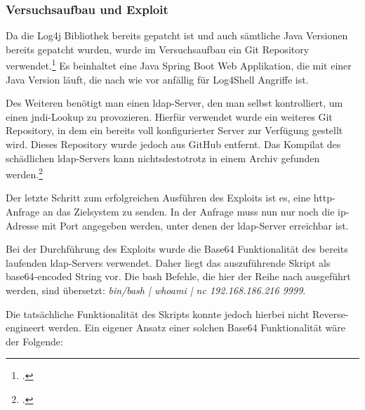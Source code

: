 
\subsubsection{Versuchsaufbau und Exploit}
Da die Log4j Bibliothek bereits gepatcht ist und auch sämtliche Java Versionen bereits gepatcht wurden, wurde im Versuchsaufbau ein Git Repository verwendet.\footcite{log4jvulnerableapp}
Es beinhaltet eine Java Spring Boot Web Applikation, die mit einer Java Version läuft, die nach wie vor anfällig für Log4Shell Angriffe ist.

Des Weiteren benötigt man einen \gls{ldap}-Server, den man selbst kontrolliert, um einen \gls{jndi}-Lookup zu provozieren.
Hierfür verwendet wurde ein weiteres Git Repository, in dem ein bereits voll konfigurierter Server zur Verfügung gestellt wird.
Dieses Repository wurde jedoch aus GitHub entfernt.
Das Kompilat des schädlichen \gls{ldap}-Servers kann nichtsdestotrotz in einem Archiv gefunden werden.\footcite{maliciousLdap}

Der letzte Schritt zum erfolgreichen Ausführen des Exploits ist es, eine \gls{http}-Anfrage an das Zielsystem zu senden.
In der Anfrage muss nun nur noch die \gls{ip}-Adresse mit Port angegeben werden, unter denen der \gls{ldap}-Server erreichbar ist.

\bigskip

Bei der Durchführung des Exploits wurde die Base64 Funktionalität des bereits laufenden \gls{ldap}-Servers verwendet.
Daher liegt das auszuführende Skript als base64-encoded String vor.
Die \gls{bash} Befehle, die hier der Reihe nach ausgeführt werden, sind übersetzt: \textit{bin/bash | whoami | nc 192.168.186.216 9999}.

Die tatsächliche Funktionalität des Skripts konnte jedoch hierbei nicht Reverse-engineert werden.
Ein eigener Ansatz einer solchen Base64 Funktionalität wäre der Folgende:



